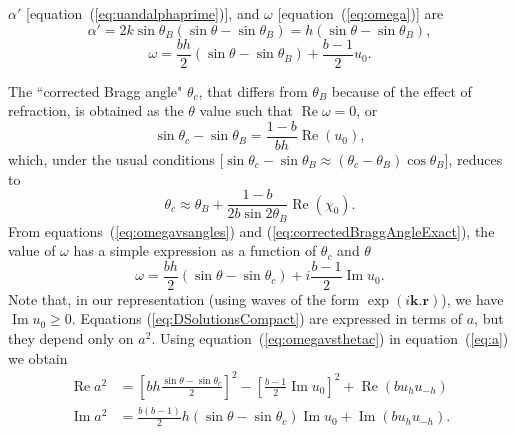 \documentclass{iucr}
\begin{document}
$\alpha'$ [equation~(\ref{eq:uandalphaprime})], and $\omega$ [equation~(\ref{eq:omega})] are
\begin{equation}\label{eq:alphaprimevsangles}
    \alpha'=2 k \sin\theta_B(\sin\theta-\sin\theta_B)=h(\sin\theta-\sin\theta_B),
\end{equation}
\begin{equation}\label{eq:omegavsangles}
    \omega=\frac{b h}{2} (\sin\theta-\sin\theta_B) + \frac{b-1}{2} u_0.
\end{equation}

The ``corrected Bragg angle" $\theta_c$, that differs from $\theta_B$ because of the effect of refraction, is obtained as the $\theta$ value such that $\operatorname{Re} \omega=0$, or
\begin{equation}\label{eq:correctedBraggAngleExact}
   \sin\theta_c - \sin\theta_B = \frac{1-b}{b h} \operatorname{Re}(u_0),  
\end{equation}
which, under the usual conditions [$\sin\theta_c-\sin\theta_B \approx  (\theta_c-\theta_B) \cos\theta_B$], reduces to
\begin{equation}\label{eq:correctedBraggAngle}
   \theta_c \approx \theta_B + \frac{1-b}{2 b \sin2\theta_B} \operatorname{Re}(\chi_0).  
\end{equation}
From equations~(\ref{eq:omegavsangles}) and (\ref{eq:correctedBraggAngleExact}), the value of $\omega$ 
has a simple expression as a function of $\theta_c$ and $\theta$
\begin{equation}\label{eq:omegavsthetac} 
    \omega=\frac{b h}{2} (\sin\theta-\sin\theta_c) + i \frac{b-1}{2} \operatorname{Im}u_0.
\end{equation}
Note that, in our representation (using waves of the form $\exp(i\textbf{k}.\textbf{r})$), we have $\operatorname{Im}u_0 \ge 0$.
Equations (\ref{eq:DSolutionsCompact}) are expressed in terms of $a$, but they depend only on $a^2$. 
Using equation~(\ref{eq:omegavsthetac}) in equation~(\ref{eq:a}) we obtain
\begin{subequations}\label{eq:avsthetac}
\begin{align}
\operatorname{Re}a^2&=\left[ bh
\frac{\sin\theta-\sin\theta_c}{2}
\right]^2 - \left[ \frac{b-1}{2}\operatorname{Im}u_0 \right]^2 + \operatorname{Re}(b u_h u_{-h})  \\
\operatorname{Im}a^2 &= \frac{b(b-1)}{2} h  (\sin\theta-\sin\theta_c) \operatorname{Im}u_0 + \operatorname{Im} (b u_h u_{-h}). 
\end{align}
\end{subequations}
\end{document}
